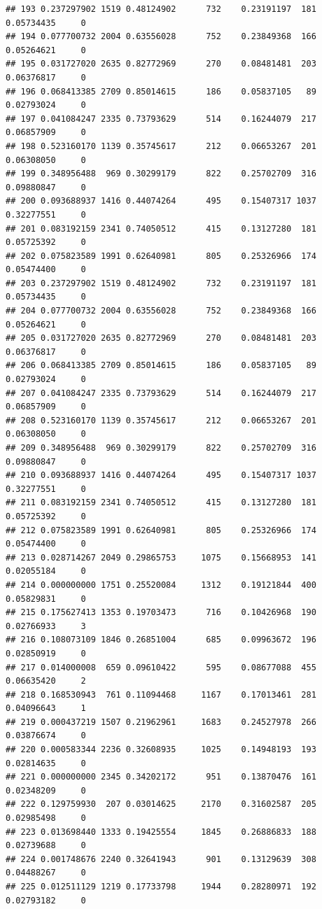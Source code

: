\documentclass[
]{article}
\begin{document}
\begin{verbatim}
## 193 0.237297902 1519 0.48124902      732    0.23191197  181 0.05734435     0
## 194 0.077700732 2004 0.63556028      752    0.23849368  166 0.05264621     0
## 195 0.031727020 2635 0.82772969      270    0.08481481  203 0.06376817     0
## 196 0.068413385 2709 0.85014615      186    0.05837105   89 0.02793024     0
## 197 0.041084247 2335 0.73793629      514    0.16244079  217 0.06857909     0
## 198 0.523160170 1139 0.35745617      212    0.06653267  201 0.06308050     0
## 199 0.348956488  969 0.30299179      822    0.25702709  316 0.09880847     0
## 200 0.093688937 1416 0.44074264      495    0.15407317 1037 0.32277551     0
## 201 0.083192159 2341 0.74050512      415    0.13127280  181 0.05725392     0
## 202 0.075823589 1991 0.62640981      805    0.25326966  174 0.05474400     0
## 203 0.237297902 1519 0.48124902      732    0.23191197  181 0.05734435     0
## 204 0.077700732 2004 0.63556028      752    0.23849368  166 0.05264621     0
## 205 0.031727020 2635 0.82772969      270    0.08481481  203 0.06376817     0
## 206 0.068413385 2709 0.85014615      186    0.05837105   89 0.02793024     0
## 207 0.041084247 2335 0.73793629      514    0.16244079  217 0.06857909     0
## 208 0.523160170 1139 0.35745617      212    0.06653267  201 0.06308050     0
## 209 0.348956488  969 0.30299179      822    0.25702709  316 0.09880847     0
## 210 0.093688937 1416 0.44074264      495    0.15407317 1037 0.32277551     0
## 211 0.083192159 2341 0.74050512      415    0.13127280  181 0.05725392     0
## 212 0.075823589 1991 0.62640981      805    0.25326966  174 0.05474400     0
## 213 0.028714267 2049 0.29865753     1075    0.15668953  141 0.02055184     0
## 214 0.000000000 1751 0.25520084     1312    0.19121844  400 0.05829831     0
## 215 0.175627413 1353 0.19703473      716    0.10426968  190 0.02766933     3
## 216 0.108073109 1846 0.26851004      685    0.09963672  196 0.02850919     0
## 217 0.014000008  659 0.09610422      595    0.08677088  455 0.06635420     2
## 218 0.168530943  761 0.11094468     1167    0.17013461  281 0.04096643     1
## 219 0.000437219 1507 0.21962961     1683    0.24527978  266 0.03876674     0
## 220 0.000583344 2236 0.32608935     1025    0.14948193  193 0.02814635     0
## 221 0.000000000 2345 0.34202172      951    0.13870476  161 0.02348209     0
## 222 0.129759930  207 0.03014625     2170    0.31602587  205 0.02985498     0
## 223 0.013698440 1333 0.19425554     1845    0.26886833  188 0.02739688     0
## 224 0.001748676 2240 0.32641943      901    0.13129639  308 0.04488267     0
## 225 0.012511129 1219 0.17733798     1944    0.28280971  192 0.02793182     0

\end{verbatim}
\end{document}
